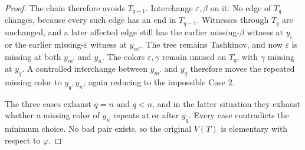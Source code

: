 \begin{proof}
The chain therefore avoids $T_{q-1}$.  Interchange
$\varepsilon,\beta$ on it.  No edge of $T_q$ changes, because every such
edge has an end in $T_{q-1}$.  Witnesses through $T_q$ are unchanged, and a
later affected edge still has the earlier missing-$\beta$ witness at $y_i$
or the earlier missing-$\varepsilon$ witness at $y_{m'}$.  The tree remains
Tashkinov, and now $\varepsilon$ is missing at both $y_{m'}$ and $y_n$.
The colors $\varepsilon,\gamma$ remain unused on $T_q$, with $\gamma$
missing at $y_q$.  A controlled interchange between $y_{m'}$ and $y_q$
therefore moves the repeated missing color to $y_q,y_n$, again reducing to
the impossible Case 2.

The three cases exhaust $q=n$ and $q<n$, and in the latter situation they
exhaust whether a missing color of $y_n$ repeats at or after $y_q$.  Every
case contradicts the minimum choice.  No bad pair exists, so the original
$V(T)$ is elementary with respect to $\varphi$.
\end{proof}
